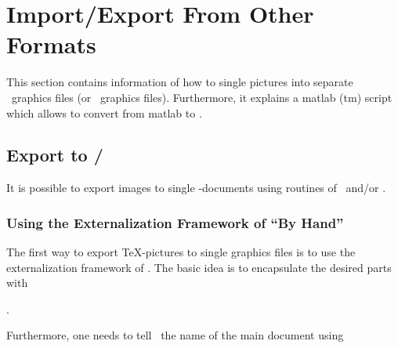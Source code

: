\section{Import/Export From Other Formats}
\label{sec:pgfplots:importexport}
This section contains information of how to single pictures into separate \pdf\ graphics files (or \eps\ graphics files). Furthermore, it explains a matlab (tm) script which allows to convert from matlab to \PGFPlots.

\subsection[Export to pdf/eps]{Export to {\normalfont\pdf/\eps}}
\label{sec:pgfplots:export}
It is possible to export images to single \pdf-documents using routines of \pgfname\ and/or \Tikz.

\subsubsection[Using the Externalization Framework of PGF By Hand]{Using the Externalization Framework of {\normalfont\pgfname} ``By Hand''}
The first way to export \TeX-pictures to single graphics files is to use the externalization framework of \pgfname.
The basic idea is to encapsulate the desired parts with

\declareandlabel{\beginpgfgraphicnamed}


\declareandlabel{\endpgfgraphicnamed}. 

\noindent Furthermore, one needs to tell \pgfname\ the name of the main document using

\declareandlabel{\pgfrealjobname}

